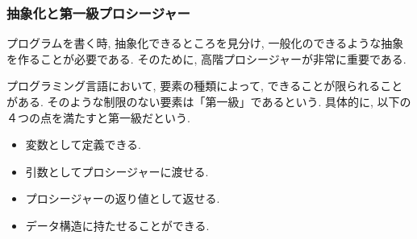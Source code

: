 \subsubsection*{抽象化と第一級プロシージャー}
プログラムを書く時, 抽象化できるところを見分け,
一般化のできるような抽象を作ることが必要である.
そのために, 高階プロシージャーが非常に重要である.

プログラミング言語において, 要素の種類によって,
できることが限られることがある. そのような制限のない要素は「第一級」であるという.
具体的に, 以下の４つの点を満たすと第一級だという.

\begin{itemize}
\item 変数として定義できる.
\item 引数としてプロシージャーに渡せる.
\item プロシージャーの返り値として返せる.
\item データ構造に持たせることができる.
\end{itemize}

